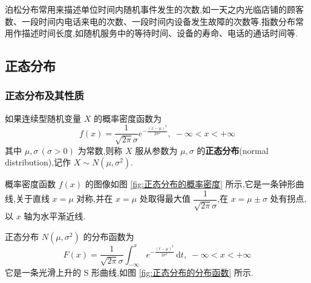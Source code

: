 \begin{note}
    \indent 泊松分布常用来描述单位时间内随机事件发生的次数,如一天之内光临店铺的顾客数、一段时间内电话来电的次数、一段时间内设备发生故障的次数等.指数分布常用作描述时间长度,如随机服务中的等待时间、设备的寿命、电话的通话时间等.
\end{note}

\subsection{正态分布}

\subsubsection{正态分布及其性质}

\begin{definition}
    \indent 如果连续型随机变量 $X$ 的概率密度函数为
    $$
    f(x) = \dfrac{1}{\sqrt{2\pi} \sigma} e^{-\frac{(x-\mu)^2}{2\sigma^2}}, \; -\infty < x < +\infty
    $$
    其中 $\mu,\sigma \, (\sigma>0)$ 为常数,则称 $X$ 服从参数为 $\mu,\sigma$ 的\textbf{正态分布}(normal distribution),记作 $X \sim N(\mu,\sigma^2)$.
\end{definition}

概率密度函数 $f(x)$ 的图像如图 \ref{fig:正态分布的概率密度} 所示,它是一条钟形曲线,关于直线 $x=\mu$ 对称,并在 $x=\mu$ 处取得最大值 $\dfrac{1}{\sqrt{2\pi}\sigma}$,在 $x=\mu\pm\sigma$ 处有拐点,以 $x$ 轴为水平渐近线.

\vspace{0.5em}

正态分布 $N(\mu,\sigma^2)$ 的分布函数为
$$
F(x) = \dfrac{1}{\sqrt{2\pi} \sigma} \int_{-\infty}^x e^{-\frac{(t-\mu)^2}{2\sigma^2}} \, \text{d}t, \; -\infty < x < +\infty
$$
它是一条光滑上升的 S 形曲线,如图 \ref{fig:正态分布的分布函数} 所示.

